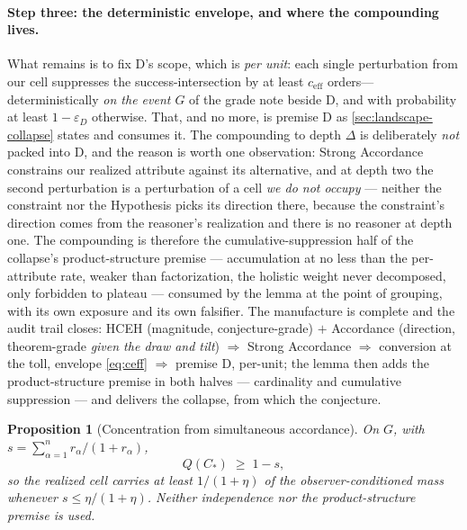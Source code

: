 \documentclass[11pt]{article}
\newtheorem{proposition}{Proposition}
\theoremstyle{definition}
\begin{document}
\paragraph{Step three: the deterministic envelope, and where the compounding lives.} What remains is to fix D's scope, which is \emph{per unit}: each single perturbation from our cell suppresses the success-intersection by at least $c_{\mathrm{eff}}$ orders---deterministically \emph{on the event $G$} of the grade note beside D, and with probability at least $1 - \varepsilon_D$ otherwise. That, and no more, is premise D as \autoref{sec:landscape-collapse} states and consumes it. The compounding to depth $\Delta$ is deliberately \emph{not} packed into D, and the reason is worth one observation: Strong Accordance constrains our realized attribute against its alternative, and at depth two the second perturbation is a perturbation of a cell \emph{we do not occupy} --- neither the constraint nor the Hypothesis picks its direction there, because the constraint's direction comes from the reasoner's realization and there is no reasoner at depth one. The compounding is therefore the cumulative-suppression half of the collapse's product-structure premise --- accumulation at no less than the per-attribute rate, weaker than factorization, the holistic weight never decomposed, only forbidden to plateau --- consumed by the lemma at the point of grouping, with its own exposure and its own falsifier. The manufacture is complete and the audit trail closes: HCEH (magnitude, conjecture-grade) $+$ Accordance (direction, theorem-grade \emph{given the draw and tilt}) $\Rightarrow$ Strong Accordance $\Rightarrow$ conversion at the toll, envelope \eqref{eq:ceff} $\Rightarrow$ premise D, per-unit; the lemma then adds the product-structure premise in both halves --- cardinality and cumulative suppression --- and delivers the collapse, from which the conjecture.


\begin{proposition}[Concentration from simultaneous accordance]
\label{prop:union-concentration}
On $G$, with $s = \sum_{\alpha=1}^{n} r_\alpha/(1+r_\alpha)$,
\begin{equation}
\label{eq:union-concentration}
Q(C_\ast) \;\ge\; 1 - s ,
\end{equation}
so the realized cell carries at least $1/(1+\eta)$ of the observer-conditioned mass whenever $s \le \eta/(1+\eta)$. Neither independence nor the product-structure premise is used.
\end{proposition}
\end{document}
